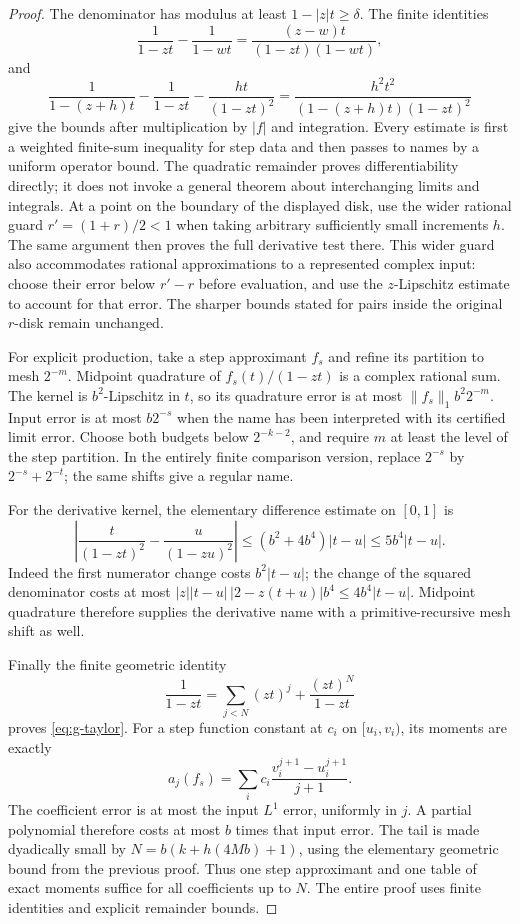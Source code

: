 \begin{proof}
The denominator has modulus at least \(1-|z|t\geq\delta\).
The finite identities
\[
 \frac1{1-zt}-\frac1{1-wt}
       =\frac{(z-w)t}{(1-zt)(1-wt)},
\]
and
\[
 \frac1{1-(z+h)t}-\frac1{1-zt}
        -\frac{ht}{(1-zt)^2}
       =\frac{h^2t^2}{(1-(z+h)t)(1-zt)^2}
\]
give the bounds after multiplication by \(|f|\) and integration.
Every estimate is first a weighted finite-sum inequality for step
data and then passes to names by a uniform operator bound. The
quadratic remainder proves differentiability directly; it does not
invoke a general theorem about interchanging limits and integrals.
At a point on the boundary of the displayed disk, use the wider rational
guard \(r'=(1+r)/2<1\) when taking arbitrary sufficiently small
increments \(h\). The same argument then proves the full derivative
test there. This wider guard also accommodates rational approximations
to a represented complex input: choose their error below \(r'-r\)
before evaluation, and use the \(z\)-Lipschitz estimate to account for
that error. The sharper bounds stated for pairs inside the original
\(r\)-disk remain unchanged.

For explicit production, take a step approximant \(f_s\) and refine
its partition to mesh \(2^{-m}\). Midpoint quadrature of
\(f_s(t)/(1-zt)\) is a complex rational sum. The kernel is
\(b^2\)-Lipschitz in \(t\), so its quadrature error is at most
\(\|f_s\|_1b^2 2^{-m}\). Input error is at most \(b2^{-s}\)
when the name has been interpreted with its certified limit error.
Choose both budgets below \(2^{-k-2}\), and require \(m\) at least
the level of the step partition. In the entirely finite comparison
version, replace \(2^{-s}\) by \(2^{-s}+2^{-t}\); the same shifts
give a regular name.

For the derivative kernel, the elementary difference estimate on
\([0,1]\) is
\[
 \left|\frac{t}{(1-zt)^2}-\frac{u}{(1-zu)^2}\right|
 \leq (b^2+4b^4)|t-u|\leq5b^4|t-u|.
\]
Indeed the first numerator change costs \(b^2|t-u|\); the change of
the squared denominator costs at most
\(|z||t-u|\,|2-z(t+u)|b^4\leq4b^4|t-u|\).
Midpoint quadrature therefore supplies the derivative name with a
primitive-recursive mesh shift as well.

Finally the finite geometric identity
\[
 \frac1{1-zt}=\sum_{j<N}(zt)^j+\frac{(zt)^N}{1-zt}
\]
proves \eqref{eq:g-taylor}. For a step function constant at \(c_i\)
on \([u_i,v_i)\), its moments are exactly
\[
 a_j(f_s)=\sum_i c_i
       \frac{v_i^{j+1}-u_i^{j+1}}{j+1}.
 \tag{M}\label{eq:moments}
\]
The coefficient error is at most the input \(L^1\) error, uniformly in
\(j\). A partial polynomial therefore costs at most \(b\) times that
input error. The tail is made dyadically small by
\(N=b(k+h(4Mb)+1)\), using the elementary geometric bound from the
previous proof. Thus one step approximant and one table of exact
moments suffice for all coefficients up to \(N\). The entire proof
uses finite identities and explicit remainder bounds.
\end{proof}

